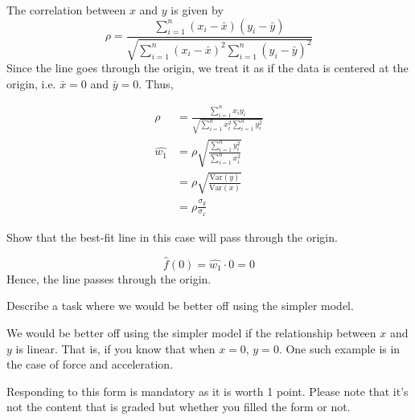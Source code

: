 \documentclass{article}
\newcommand{\V}{\text{Var}}
\begin{document}
\begin{probset}
\begin{prob}
\begin{subprobset}
\begin{subprob}
        \begin{soln}
            The correlation between $x$ and $y$ is given by 
            \[ \rho = \frac{\sum_{i=1}^n (x_i - \bar{x})(y_i - \bar{y})}{\sqrt{\sum_{i=1}^n (x_i - \bar{x})^2 \sum_{i=1}^n (y_i - \bar{y})^2}} \]
            Since the line goes through the origin, we treat it as if the data is centered at the origin, i.e. $\bar{x} = 0$ and $\bar{y} = 0$. Thus,

            \begin{align*}
                \rho &= \frac{\sum_{i=1}^n x_i y_i}{\sqrt{\sum_{i=1}^n x_i^2 \sum_{i=1}^n y_i^2}} \\
                \hat{w_1} &= \rho \sqrt{\frac{\sum_{i=1}^n y_i^2}{\sum_{i=1}^n x_i^2}} \\
                &= \rho \sqrt{\frac{\V(y)}{\V(x)}} \\
                &= \rho \frac{\sigma_y}{\sigma_x}
            \end{align*}
        \end{soln}
    \end{subprob}

    \newpage

    \begin{subprob}
        Show that the best-fit line in this case will pass through the origin.

        \begin{soln}
            \[ \hat{f}(0) = \hat{w_1} \cdot 0 = 0 \]
            Hence, the line passes through the origin.
        \end{soln}
    \end{subprob}

    \begin{subprob}
        Describe a task where we would be better off using the simpler model.

        \begin{soln}
            We would be better off using the simpler model if the relationship between $x$ and $y$ is linear. That is, if you know that when $x = 0$, $y = 0$. One such example is in the case of force and acceleration.
        \end{soln}
    \end{subprob}
\end{subprobset}
\end{prob}

\begin{prob}
    Responding to this form is mandatory as it is worth 1 point. Please note that it's not the content that is graded but whether you filled the form or not.
\end{prob}
\end{probset}
\end{document}

